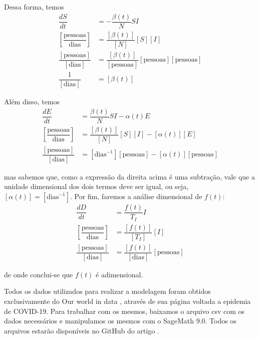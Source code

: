 \documentclass{article}
\begin{document}
Dessa forma, temos
\begin{equation*}
    \begin{split}
        \dfrac{dS}{dt} & = -\dfrac{\beta(t)}{N}SI \\
        \left[\dfrac{\text{pessoas}}{\text{dias}}\right] & = \dfrac{[\beta(t)]}{[N]}[S][I] \\
        \dfrac{[\text{pessoas}]}{[\text{dias}]} & = \dfrac{[\beta(t)]}{[\text{pessoas}]}[\text{pessoas}][\text{pessoas}] \\
        \dfrac{1}{[\text{dias}]} & = [\beta(t)]
    \end{split}
\end{equation*}

Além disso, temos
\begin{equation*}
    \begin{split}
        \dfrac{dE}{dt} & = \dfrac{\beta(t)}{N}SI - \alpha(t) E \\
        \left[\dfrac{\text{pessoas}}{\text{dias}}\right] & = \dfrac{[\beta(t)]}{[N]}[S][I] - [\alpha(t)][E] \\
        \dfrac{[\text{pessoas}]}{[\text{dias}]} & = [\text{dias}^{-1}][\text{pessoas}] - [\alpha(t)][\text{pessoas}]
    \end{split}
\end{equation*}

\noindent mas sabemos que, como a expressão da direita acima é uma subtração, vale que a unidade dimensional dos dois termos deve ser igual, ou seja, $[\alpha(t)] = [\text{dias}^{-1}]$. Por fim, faremos a análise dimensional de $f(t)$:
\begin{equation*}
    \begin{split}
        \dfrac{dD}{dt} & = \dfrac{f(t)}{T_I}I \\
        \left[\dfrac{\text{pessoas}}{\text{dias}}\right] & = \dfrac{[f(t)]}{[T_I]}[I] \\
        \dfrac{[\text{pessoas}]}{[\text{dias}]} & = \dfrac{[f(t)]}{[\text{dias}]}[\text{pessoas}]
    \end{split}
\end{equation*}

\noindent de onde conclui-se que $f(t)$ é adimensional.

Todos os dados utilizados para realizar a modelagem foram obtidos exclusivamente do Our world in data \cite{owid}, através de sua página voltada a epidemia de COVID-19. Para trabalhar com os mesmos, baixamos o arquivo csv com os dados necessários e manipulamos os mesmos com o SageMath 9.0. Todos os arquivos estarão disponíveis no GitHub do artigo \cite{github}.
\end{document}
